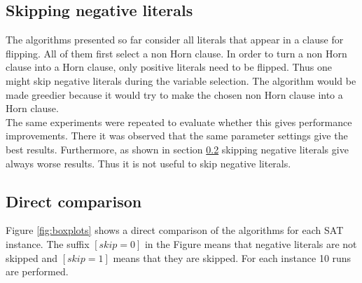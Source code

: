 \documentclass[12pt,a4paper]{article}
\begin{document}
\subsection{Skipping negative literals}
\label{sec:skip}
The algorithms presented so far consider all literals that appear in a clause for flipping. All of them first select a non Horn clause. In order to turn a non Horn clause into a Horn clause, only positive literals need to be flipped. Thus one might skip negative literals during the variable selection.  The algorithm would be made greedier because it would try to make the chosen non Horn clause into a Horn clause.\\

The same experiments were repeated to evaluate whether this gives performance improvements. There it was observed that the same parameter settings give the best results. Furthermore, as shown in section \ref{sec:dir_comp} skipping negative literals give always worse results. Thus it is not useful to skip negative literals.
\subsection{Direct comparison}
\label{sec:dir_comp}
Figure \ref{fig:boxplots} shows a direct comparison of the algorithms for each SAT instance. The suffix $[skip=0]$ in the Figure means that negative literals are not skipped and $[skip=1]$ means that they are skipped. For each instance 10 runs are performed.\\
\end{document}
